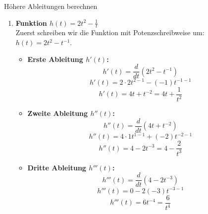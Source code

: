 \begin{loesungsumgebung}{Höhere Ableitungen berechnen}
\begin{enumerate}[label=(\alph*)]
    \item \textbf{Funktion $h(t) = 2t^2 - \frac{1}{t}$} \\
    Zuerst schreiben wir die Funktion mit Potenzschreibweise um: $h(t) = 2t^2 - t^{-1}$.
    \begin{itemize}
        \item \textbf{Erste Ableitung $h'(t)$:}
        $$ h'(t) = \frac{d}{dt}(2t^2 - t^{-1}) $$
        $$ h'(t) = 2 \cdot 2t^{2-1} - (-1)t^{-1-1} $$
        $$ h'(t) = 4t + t^{-2} = 4t + \frac{1}{t^2} $$
        \item \textbf{Zweite Ableitung $h''(t)$:}
        $$ h''(t) = \frac{d}{dt}(4t + t^{-2}) $$
        $$ h''(t) = 4 \cdot 1t^{1-1} + (-2)t^{-2-1} $$
        $$ h''(t) = 4 - 2t^{-3} = 4 - \frac{2}{t^3} $$
        \item \textbf{Dritte Ableitung $h'''(t)$:}
        $$ h'''(t) = \frac{d}{dt}(4 - 2t^{-3}) $$
        $$ h'''(t) = 0 - 2(-3)t^{-3-1} $$
        $$ h'''(t) = 6t^{-4} = \frac{6}{t^4} $$
    \end{itemize}
\end{enumerate}

\end{loesungsumgebung}

